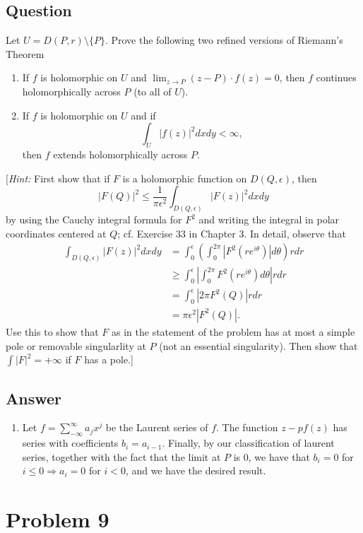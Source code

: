 \documentclass[11pt]{article}
\begin{document}
\subsection{Question}
Let $U = D(P,r) \setminus \{ P\}$. Prove the following two refined versions of Riemann's Theorem
\begin{enumerate}
\item If $f$ is holomorphic on $U$ and $\lim_{z \to P}(z-P) \cdot f(z) =0$, then $f$ continues holomorphically across $P$ (to all of $U$).

\item If $f$ is holomorphic on $U$ and if 
\[\int_U |f(z)|^2 dx dy < \infty,\]
then $f$ extends holomorphically across $P$. 
\end{enumerate}
[\emph{Hint:} First show that if $F$ is a holomorphic function on $D(Q,\epsilon)$, then
\[|F(Q)|^2 \leq \frac{1}{\pi \epsilon^2} \int_{D(Q,\epsilon)}|F(z)|^2 dxdy\]
by using the Cauchy integral formula for $F^2$ and writing the integral in polar coordinates centered at $Q$; cf. Exercise 33 in Chapter 3. In detail, observe that
\begin{align*} 
\int_{D(Q,\epsilon)}|F(z)|^2 dxdy &= \int_0^\epsilon \left( \int_0^{2 \pi} |F^2(re^{i\theta})|d\theta \right) r dr\\
&\geq \int_0^\epsilon \left| \int_0^{2 \pi} F^2(re^{i \theta}) d\theta\right| r dr\\
&= \int_0^\epsilon |2 \pi F^2(Q)|rdr\\
&= \pi \epsilon^2|F^2(Q)|.
\end{align*}
Use this to show that $F$ as in the statement of the problem has at most a simple pole or removable singularlity at $P$ (not an essential singularity). Then show that $\int|F|^2 = + \infty $ if $F$ has  a pole.]
\subsection{Answer}
\begin{enumerate}
\item Let $f = \sum_{- \infty}^ \infty a_j x^j$ be the Laurent series of $f$. The function $z-pf(z)$ has series with coefficients $b_i = a_{i-1}$. Finally, by our classification of laurent series, together with the fact that the limit at $P$ is 0, we have that $b_i =0$ for $i \leq 0 \Rightarrow a_i = 0$ for $i<0$, and we have the desired result.
\end{enumerate}

\section{Problem 9}
\end{document}
